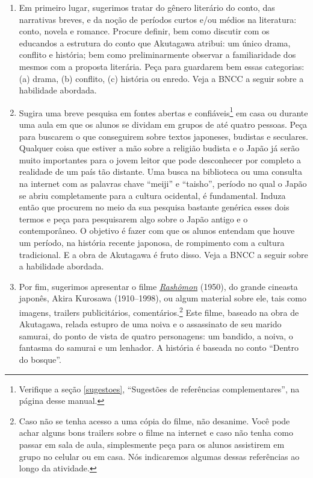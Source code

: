 \documentclass[12pt]{extarticle}
\begin{document}
\begin{enumerate} 
\item Em primeiro lugar, sugerimos tratar do gênero literário
do conto,  das narrativas breves, e da noção de períodos curtos e/ou
médios na literatura: conto, novela e romance. Procure definir, bem como
discutir com os educandos a estrutura do conto que Akutagawa atribui: um
único drama, conflito e história; bem como preliminarmente observar a
familiaridade dos mesmos com a proposta literária. Peça para guardarem
bem essas categorias: (a) drama, (b) conflito, (c) história ou enredo.
Veja a BNCC a seguir sobre a habilidade abordada.


\item Sugira uma breve pesquisa em fontes abertas e confiáveis\footnote{Verifique 
a seção \ref{sugestoes}, ``Sugestões de referências complementares'', 
na página \pageref{sugestoes} desse manual.} 
em casa ou durante uma aula em que os alunos se
dividam em grupos de até quatro pessoas. 
Peça para buscarem o que conseguirem
sobre textos japoneses, budistas e seculares.
Qualquer coisa que estiver a
mão sobre a religião budista e o Japão já serão muito importantes para o
jovem leitor que pode desconhecer por completo a realidade de um país tão
distante. Uma busca na biblioteca ou uma consulta na internet com as
palavras chave ``meiji'' e ``taisho'', período no qual o Japão se abriu
completamente para a cultura ocidental, é fundamental. Induza então que
procurem no meio da sua pesquisa bastante genérica esses dois termos e peça
para pesquisarem algo sobre o Japão antigo e o contemporâneo. O objetivo é
fazer com que os alunos entendam que houve um período, na história recente
japonosa, de rompimento com a cultura tradicional. E a obra de Akutagawa é
fruto disso. Veja a BNCC a seguir sobre a habilidade abordada.

\item Por fim, sugerimos apresentar o filme
\href{https://www.youtube.com/watch?v=xCZ9TguVOIA}{\textit{Rashômon}} (1950),
do grande cineasta japonês, Akira Kurosawa (1910--1998), ou algum material
sobre ele, tais como imagens, trailers publicitários,
comentários.\footnote{Caso não se tenha acesso a uma cópia do filme, não
desanime. Você pode achar alguns bons trailers sobre o filme na internet e
caso não tenha como passar em sala de aula, simplesmente peça para os
alunos assistirem em grupo no celular ou em casa.  Nós indicaremos algumas
dessas referências ao longo da atividade.} Este filme, baseado na obra de
Akutagawa, relada estupro de uma noiva e o assassinato de seu marido
samurai, do ponto de vista de quatro personagens: um bandido, a noiva, o
fantasma do samurai e um lenhador.  A história é baseada no conto ``Dentro do
bosque''.  

\end{enumerate}
\end{document}
